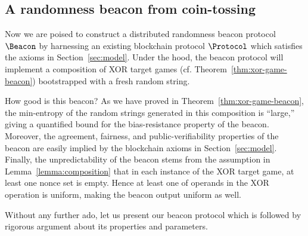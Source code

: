 


\subsection{A randomness beacon from coin-tossing}
Now we are poised to construct a distributed randomness beacon protocol $\Beacon$ 
by harnessing an existing blockchain protocol $\Protocol$ 
which satisfies the axioms in Section~\ref{sec:model}. 
Under the hood, the beacon protocol will implement a composition of XOR target games 
(cf. Theorem~\ref{thm:xor-game-beacon}) bootstrapped with a fresh random string. 

How good is this beacon?
As we have proved in Theorem~\ref{thm:xor-game-beacon}, 
the min-entropy of the random strings generated in this composition 
is ``large,'' giving a quantified bound for the bias-resistance property of the beacon. 
Moreover, the agreement, fairness, and public-verifiability properties of the beacon 
are easily implied by the blockchain axioms in Section~\ref{sec:model}. 
Finally, the unpredictability of the beacon stems from 
the assumption in Lemma~\ref{lemma:composition} that in each instance of the XOR target game, 
at least one nonce set is empty. 
Hence at least one of operands in the XOR operation is uniform, making the beacon output 
uniform as well.

Without any further ado, let us present our beacon protocol which is followed by 
rigorous argument about its properties and parameters.





